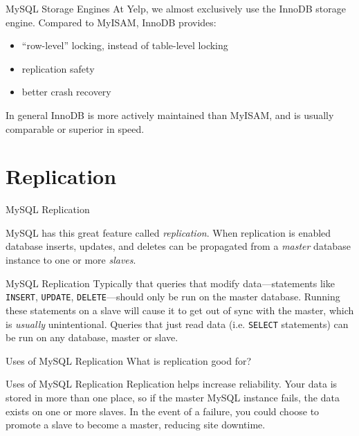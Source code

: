 \documentclass[14pt]{beamer}
\begin{document}
\begin{frame}{MySQL Storage Engines}
  At Yelp, we
  almost exclusively use the InnoDB storage engine. Compared to MyISAM, InnoDB provides:
  \begin{itemize}
    \item ``row-level'' locking, instead of table-level locking
    \item replication safety
    \item better crash recovery
  \end{itemize}
  In general InnoDB is more actively maintained than MyISAM, and is usually
  comparable or superior in speed.
\end{frame}

\section{Replication}

\begin{frame}{MySQL Replication}

  MySQL has this great feature called \emph{replication}.
  \newline
  \newline
  When replication is
  enabled database inserts, updates, and deletes can be propagated from a \emph{master} database
  instance to one or more \emph{slaves}.
\end{frame}

\begin{frame}{MySQL Replication}
  Typically that queries that modify data---statements like \texttt{INSERT},
  \texttt{UPDATE}, \texttt{DELETE}---should only be run on the master
  database. Running these statements on a slave will cause it to get out of sync
  with the master, which is \emph{usually} unintentional.
  \newline
  \newline
  Queries that just read data (i.e. \texttt{SELECT} statements) can be run on any database, master or slave.
\end{frame}

\begin{frame}{Uses of MySQL Replication}
  What is replication good for?
\end{frame}

\begin{frame}{Uses of MySQL Replication}
  Replication helps increase reliability. Your data is stored in more than one
  place, so if the master MySQL instance fails, the data exists on one or more slaves.
  \newline
  \newline
  In the event of a failure, you could choose to promote a slave to become a
  master, reducing site downtime.
\end{frame}
\end{document}
